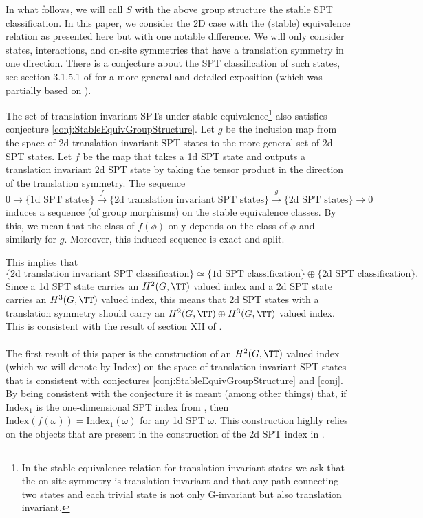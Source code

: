 In what follows, we will call $S$ with the above group structure the stable SPT classification. In this paper, we consider the 2D case with the (stable) equivalence relation as presented here but with one notable difference. We will only consider states, interactions, and on-site symmetries that have a translation symmetry in one direction. There is a conjecture about the SPT classification of such states, see section 3.1.5.1 of \cite{xiong2019classification} for a more general and detailed exposition (which was partially based on \cite{Chen_2013}).
\begin{conjecture}\label{conj}
	The set of translation invariant SPTs under stable equivalence\footnote{In the stable equivalence relation for translation invariant states we ask that the on-site symmetry is translation invariant and that any path connecting two states and each trivial state is not only G-invariant but also translation invariant.} also satisfies conjecture \ref{conj:StableEquivGroupStructure}. Let $g$ be the inclusion map from the space of 2d translation invariant SPT states to the more general set of 2d SPT states. Let $f$ be the map that takes a 1d SPT state and outputs a translation invariant 2d SPT state by taking the tensor product in the direction of the translation symmetry. The sequence
	\begin{equation}
		0\rightarrow\{\text{1d SPT states}\}\stackrel{f}{\rightarrow}\{\text{2d translation invariant SPT states}\}\stackrel{g}{\rightarrow}\{\text{2d SPT states}\}\rightarrow 0
	\end{equation}
	induces a sequence (of group morphisms) on the stable equivalence classes. By this, we mean that the class of $f(\phi)$ only depends on the class of $\phi$ and similarly for $g$. Moreover, this induced sequence is exact and split.
\end{conjecture}
This implies that
\begin{equation}
	\{\text{2d translation invariant SPT classification}\}\simeq \{\text{1d SPT classification}\}\oplus \{\text{2d SPT classification}\}.
\end{equation}
Since a 1d SPT state carries an $H^2(G,\TT)$ valued index and a 2d SPT state carries an $H^3(G,\TT)$ valued index, this means that 2d SPT states with a translation symmetry should carry an $H^2(G,\TT)\oplus H^3(G,\TT)$ valued index. This is consistent with the result of section XII of \cite{Chen_2013}.
\\\\
The first result of this paper is the construction of an $H^2(G,\TT)$ valued index (which we will denote by $\textrm{Index}$) on the space of translation invariant SPT states that is consistent with conjectures \ref{conj:StableEquivGroupStructure} and \ref{conj}. By being consistent with the conjecture it is meant (among other things) that, if $\textrm{Index}_1$ is the one-dimensional SPT index from \cite{ogata2021classification}, then $\textrm{Index}(f(\omega))=\textrm{Index}_1(\omega)$ for any 1d SPT $\omega$. This construction highly relies on the objects that are present in the construction of the 2d SPT index in \cite{Ogata2d}.
